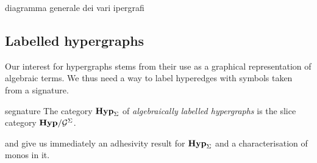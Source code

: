 \documentclass[3p]{elsarticle}
\newcommand{\catname}[1]{\textbf{\textup{#1}}}
\newcommand{\hyp}{\catname{Hyp}}
\newcommand{\hyps}{\catname{Hyp}_{\Sigma}}
\theoremstyle{remark}
\theoremstyle{definition}
\begin{document}
\begin{rem}\label{rem:map1}
	diagramma generale dei vari ipergrafi
\end{rem}
\subsection{Labelled hypergraphs}\label{sssect:hyp_alg_sign}

Our interest for hypergraphs stems from their use as a graphical representation of algebraic terms. We thus need a way to label hyperedges with symbols taken from a signature.


\begin{exa}segnature The category $\hyps$ of \emph{algebraically labelled hypergraphs} is the slice category $\hyp/\mathcal{G}^\Sigma$.
\end{exa}

 and  give us immediately an adhesivity result for $\hyp_{\Sigma}$ and a characterisation of monos in it.

\end{document}
